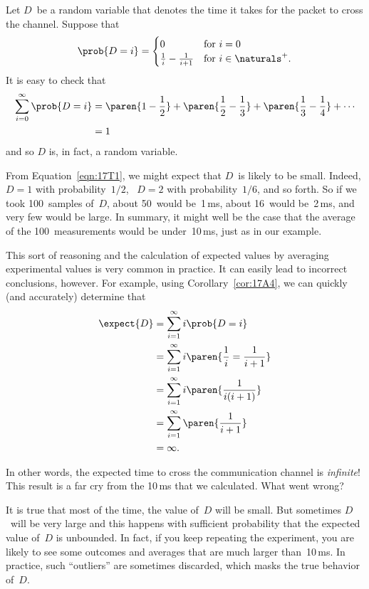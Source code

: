 Let $D$~be a random variable that denotes the time it takes for the
packet to cross the channel.  Suppose that 
\begin{equation}\label{eqn:17T1}
\prob{D = i} = \begin{cases}
                0 & \text{for $i = 0$} \\
                \frac{1}{i} - \frac{1}{i + 1}   & \text{for $i \in \naturals^+$}.
               \end{cases}
\end{equation}
It is easy to check that
\begin{align*}
\sum_{i = 0}^\infty \prob{D = i}
    &= \paren{1 - \frac{1}{2}} + \paren{\frac{1}{2} - \frac{1}{3}}
        + \paren{\frac{1}{3} - \frac{1}{4}} + \cdots \\
    &= 1
\end{align*}
and so $D$ is, in fact, a random variable.

From Equation~\ref{eqn:17T1}, we might expect that $D$~is likely to be
small.  Indeed, $D = 1$ with probability~$1/2$, \ $D = 2$ with
probability~$1/6$, and so forth.  So if we took 100~samples of~$D$,
about 50~would be~1\,ms, about 16~would be~2\,ms, and very few would
be large.  In summary, it might well be the case that the average of
the 100~measurements would be under~10\,ms, just as in our example.

This sort of reasoning and the calculation of expected values by
averaging experimental values is very common in practice.  It can
easily lead to incorrect conclusions, however.  For example, using
Corollary~\ref{cor:17A4}, we can quickly (and accurately) determine
that
\begin{align*}
\expect{D}
    &= \sum_{i = 1}^\infty i \prob{D = i} \\
    &= \sum_{i = 1}^\infty i \paren{\frac{1}{i} = \frac{1}{i + 1}} \\
    &= \sum_{i = 1}^\infty i \paren{\frac{1}{i (i + 1)}} \\
    &= \sum_{i = 1}^\infty \paren{\frac{1}{i + 1}} \\
    &= \infty.
\end{align*}

In other words, the expected time to cross the communication channel
is \emph{infinite}!  This result is a far cry from the 10\,ms that we
calculated.  What went wrong?

It is true that most of the time, the value of~$D$ will be small.  But
sometimes $D$~will be very large and this happens with sufficient
probability that the expected value of~$D$ is unbounded.  In fact, if
you keep repeating the experiment, you are likely to see some outcomes
and averages that are much larger than~10\,ms.  In practice, such
``outliers'' are sometimes discarded, which masks the true behavior
of~$D$.

